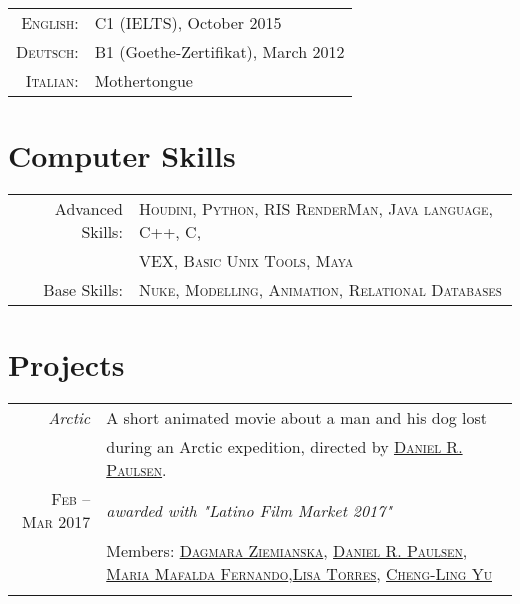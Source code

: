 \documentclass[a4paper,10pt]{article} %
\begin{document}
\begin{tabular}{rl}
\textsc{English:} & C1 (IELTS), October 2015\\

\textsc{Deutsch:} & B1 (Goethe-Zertifikat), March 2012\\

\textsc{Italian:} & Mothertongue\\

\end{tabular}



\section{Computer Skills}

\begin{tabular}{rl}
Advanced Skills: & \textsc{Houdini}, \textsc{Python}, \textsc{RIS RenderMan}, \textsc{Java language}, \textsc{C++}, \textsc{C},\\
& \textsc{VEX}, \textsc{Basic Unix Tools}, \textsc{Maya}\\

Base Skills: & \setmainfont[SmallCapsFont=Fontin SmallCaps]{Fontin-Regular} \textsc{Nuke}, \textsc{Modelling}, \textsc{Animation}, \textsc{Relational Databases}\\
\end{tabular}

\section{Projects}

\begin{tabular}{r|p{11cm}}
\emph{Arctic} &A short animated movie about a man and his dog lost\\ 
& during an Arctic expedition, directed by \href{https://www.linkedin.com/in/danrpaulsen/}{\textsc{Daniel R. Paulsen}}. \\
\textsc{ Feb – Mar 2017} & \emph{awarded with "Latino Film Market 2017"}\\
& \footnotesize{Members: \href{https://www.linkedin.com/in/3dagmara}{\textsc{Dagmara Ziemianska}}, \href{https://www.linkedin.com/in/danrpaulsen/}{\textsc{Daniel R. Paulsen}}, \href{https://www.linkedin.com/in/maria-mafalda-fernando-487585b6/}{\textsc{Maria Mafalda Fernando}},\href{https://www.facebook.com/profile.php?id=26709688}{\textsc{Lisa Torres}}, \href{https://www.facebook.com/linyu00204}{\textsc{Cheng-Ling Yu}}}\\
\multicolumn{2}{c}{} \\

\end{tabular}
\end{document}
